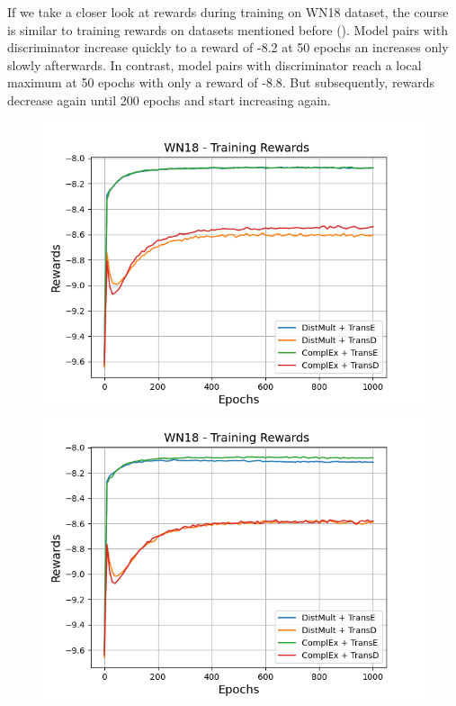 If we take a closer look at rewards during training on \textsc{WN18} dataset, the course is similar to training rewards on datasets mentioned before ().
Model pairs with \transe discriminator increase quickly to a reward of -8.2 at 50 epochs an increases only slowly afterwards.
In contrast, model pairs with \transd discriminator reach a local maximum at 50 epochs with only a reward of -8.8.
But subsequently, rewards decrease again until 200 epochs and start increasing again.
\clearpage
\begin{figure}[H]
    \centering
    \begin{minipage}{.5\textwidth}
      \centering
      \includegraphics[width=0.9\linewidth]{figures/results/gan_train/not_pretrained/uncertainty/max_distribution/entropy/wn18/1k_epochs/uncertainty_wn18_rew.png}
    \end{minipage}%
    \begin{minipage}{.5\textwidth}
      \centering
      \includegraphics[width=0.9\linewidth]{figures/results/gan_train/not_pretrained/uncertainty/max_distribution/least_confidence/wn18/uncertainty_wn18_rew.png}

\end{minipage}
\end{figure}

